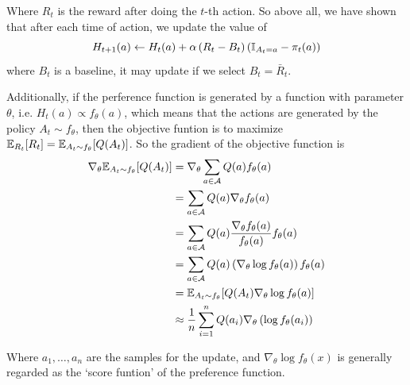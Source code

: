 Where $R_t$ is the reward after doing the $t$-th action. So above all, we have shown that after each time of action, we update the value of
$$H_{t+1}(a) \gets H_t(a) +\alpha \left(R_t-B_t\right) (\mathbb{I}_{A_t=a} - \pi_t(a))$$
where $B_t$ is a baseline, it may update if we select $B_t=\bar{R}_t$.

Additionally, if the perference function is generated by a function with parameter $\theta$, i.e. $H_t(a)\propto f_{\theta}(a)$, which means that the actions are generated by the policy $A_t\sim f_{\theta}$, then the objective funtion is to maximize $\mathbb{E}_{R_t}[R_t]=\mathbb{E}_{A_t\sim f_{\theta}}[Q(A_t)]$. So the gradient of the objective function is
\begin{align*}
\nabla_{\theta}\mathbb{E}_{A_t\sim f_{\theta}}[Q(A_t)] &= \nabla_{\theta}\sum_{a\in\mathcal{A}}Q(a)f_{\theta}(a) \\
&= \sum_{a\in\mathcal{A}}Q(a)\nabla_{\theta}f_{\theta}(a) \\
&= \sum_{a\in\mathcal{A}}Q(a)\dfrac{\nabla_{\theta}f_{\theta}(a)}{f_{\theta}(a)}f_{\theta}(a) \\
&= \sum_{a\in\mathcal{A}}Q(a)\left(\nabla_{\theta}\log f_{\theta}(a)\right)f_{\theta}(a) \\
&= \mathbb{E}_{A_t\sim f_{\theta}}[Q(A_t)\nabla_{\theta}\log f_{\theta}(a)] \\
&\approx \dfrac{1}{n}\sum_{i=1}^n Q(a_i)\nabla_{\theta}\left(\log f_{\theta}(a_i)\right)
\end{align*}

Where $a_1,\ldots,a_n$ are the samples for the update, and $\nabla_{\theta}\log f_{\theta}(x)$ is generally regarded as the `score funtion' of the preference function.

